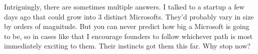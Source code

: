 Intriguingly, there are
                  sometimes multiple answers. I talked to a startup a few days
                  ago that could grow into 3 distinct Microsofts. They'd
                  probably vary in size by orders of magnitude. But you can
                  never predict how big a Microsoft is going to be, so in cases
                  like that I encourage founders to follow whichever path is
                  most immediately exciting to them. Their instincts got them
                  this far. Why stop now?


              
            
          
            
              
                


                  
              
            
          
